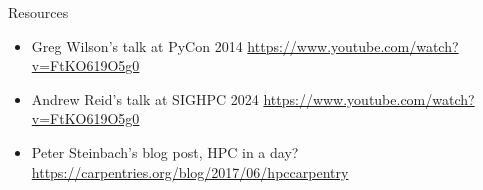 \begin{frame}{Resources}
	\begin{itemize}
		\item Greg Wilson's talk at PyCon 2014 \url{https://www.youtube.com/watch?v=FtKO619O5g0}
		\item Andrew Reid's talk at SIGHPC 2024 \url{https://www.youtube.com/watch?v=FtKO619O5g0}
		\item Peter Steinbach's blog post, HPC in a day? \url{https://carpentries.org/blog/2017/06/hpccarpentry}
	\end{itemize}
\end{frame}